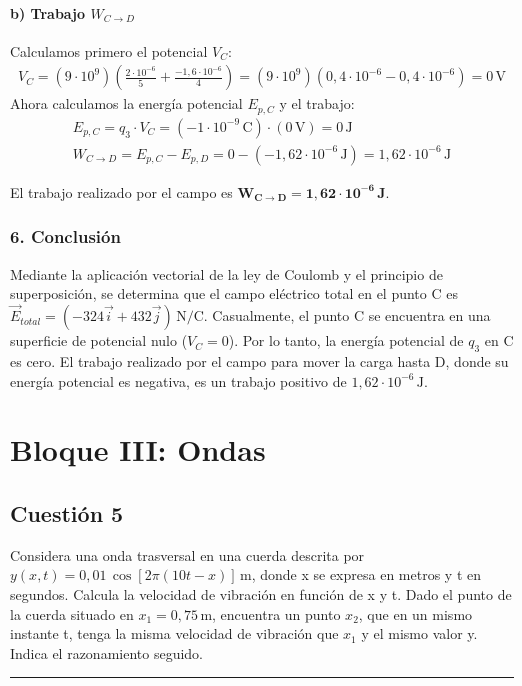 \paragraph*{b) Trabajo $W_{C \to D}$}
Calculamos primero el potencial $V_C$:
\begin{gather}
    V_C = (9\cdot10^9) \left( \frac{2\cdot10^{-6}}{5} + \frac{-1,6\cdot10^{-6}}{4} \right) = (9\cdot10^9)(0,4\cdot10^{-6} - 0,4\cdot10^{-6}) = 0 \, \text{V}
\end{gather}
Ahora calculamos la energía potencial $E_{p,C}$ y el trabajo:
\begin{gather}
    E_{p,C} = q_3 \cdot V_C = (-1\cdot10^{-9} \, \text{C}) \cdot (0 \, \text{V}) = 0 \, \text{J} \\
    W_{C \to D} = E_{p,C} - E_{p,D} = 0 - (-1,62 \cdot 10^{-6} \, \text{J}) = 1,62 \cdot 10^{-6} \, \text{J}
\end{gather}
\begin{cajaresultado}
    El trabajo realizado por el campo es $\boldsymbol{W_{C \to D} = 1,62 \cdot 10^{-6} \, \textbf{J}}$.
\end{cajaresultado}

\subsubsection*{6. Conclusión}
\begin{cajaconclusion}
Mediante la aplicación vectorial de la ley de Coulomb y el principio de superposición, se determina que el campo eléctrico total en el punto C es $\vec{E}_{total} = (-324\vec{i} + 432\vec{j}) \, \text{N/C}$.
Casualmente, el punto C se encuentra en una superficie de potencial nulo ($V_C=0$). Por lo tanto, la energía potencial de $q_3$ en C es cero. El trabajo realizado por el campo para mover la carga hasta D, donde su energía potencial es negativa, es un trabajo positivo de $1,62 \cdot 10^{-6} \, \text{J}$.
\end{cajaconclusion}
\newpage

\section{Bloque III: Ondas}
\label{sec:grav_2020_sep_ext}

\subsection{Cuestión 5}
\label{subsec:C5_2021_jun_ord}
\begin{cajaenunciado}
Considera una onda trasversal en una cuerda descrita por $y(x,t)=0,01\,\cos[2\pi(10t-x)]\,\text{m}$, donde x se expresa en metros y t en segundos. Calcula la velocidad de vibración en función de x y t. Dado el punto de la cuerda situado en $x_1=0,75\,\text{m}$, encuentra un punto $x_2$, que en un mismo instante t, tenga la misma velocidad de vibración que $x_1$ y el mismo valor y. Indica el razonamiento seguido.
\end{cajaenunciado}
\hrule
